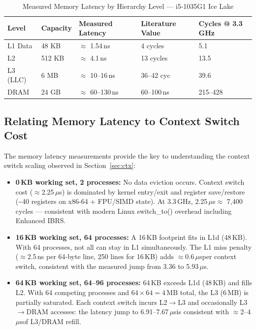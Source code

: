 \documentclass[12pt,a4paper]{article}
\newcommand{\us}{$\mu$s}
\begin{document}
\begin{table}[H]
\centering
\caption{Measured Memory Latency by Hierarchy Level — i5-1035G1 Ice Lake}
\label{tab:mem_lat}
\begin{tabular}{lllll}
\toprule
\textbf{Level} & \textbf{Capacity} & \textbf{Measured Latency} &
\textbf{Literature Value} & \textbf{Cycles @ 3.3\,GHz} \\
\midrule
L1 Data  & 48 KB   & $\approx$ 1.54\,ns  & 4 cycles    & 5.1  \\
L2       & 512 KB  & $\approx$ 4.1\,ns   & 13 cycles   & 13.5 \\
L3 (LLC) & 6 MB    & $\approx$ 10--16\,ns& 36--42 cyc  & 39.6 \\
DRAM     & 24 GB   & $\approx$ 60--130\,ns & 60--100\,ns & 215--428 \\
\bottomrule
\end{tabular}
\end{table}

\subsection{Relating Memory Latency to Context Switch Cost}

The memory latency measurements provide the key to understanding the context
switch scaling observed in Section~\ref{sec:ctx}:

\begin{itemize}
    \item \textbf{0\,KB working set, 2 processes:} No data eviction occurs.
    Context switch cost ($\approx$2.25\,\us) is dominated by kernel entry/exit
    and register save/restore (\textasciitilde{}40 registers on x86-64 +
    FPU/SIMD state). At 3.3\,GHz, 2.25\,\us $\approx$ 7,400 cycles —
    consistent with modern Linux switch\_to() overhead including Enhanced IBRS.

    \item \textbf{16\,KB working set, 64 processes:} A 16\,KB footprint fits
    in L1d (48\,KB). With 64 processes, not all can stay in L1 simultaneously.
    The L1 miss penalty ($\approx$2.5\,ns per 64-byte line, 250 lines for 16\,KB)
    adds $\approx$0.6\,\us per context switch, consistent with the measured
    jump from 3.36 to 5.93\,\us.

    \item \textbf{64\,KB working set, 64–96 processes:} 64\,KB exceeds L1d
    (48\,KB) and fills L2. With 64 competing processes and $64 \times 64 = 4\,\text{MB}$
    total, the L3 (6\,MB) is partially saturated. Each context switch incurs
    L2$\to$L3 and occasionally L3$\to$DRAM accesses: the latency jump to
    6.91–7.67\,\us is consistent with $\approx$2–4\,\us of L3/DRAM refill.
\end{itemize}
\end{document}
